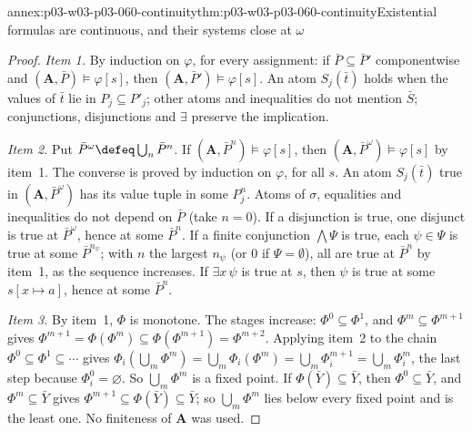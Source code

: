 \begin{annexitem}{annex:p03-w03-p03-060-continuity}{thm:p03-w03-p03-060-continuity}{Existential formulas are continuous, and their systems close at \(\omega\)}
\begin{proof}
\emph{Item 1.} By induction on \(\varphi\), for every assignment: if
\(\bar P\subseteq\bar P'\) componentwise and
\((\mathbf A,\bar P)\models\varphi[s]\), then
\((\mathbf A,\bar P')\models\varphi[s]\). An atom \(S_j(\bar t)\) holds
when the values of \(\bar t\) lie in \(P_j\subseteq P'_j\); other atoms and
inequalities do not mention \(\bar S\); conjunctions, disjunctions and
\(\exists\) preserve the implication.

\emph{Item 2.} Put \(\bar P^\omega\defeq\bigcup_n\bar P^n\). If
\((\mathbf A,\bar P^n)\models\varphi[s]\), then
\((\mathbf A,\bar P^\omega)\models\varphi[s]\) by item~1. The converse is
proved by induction on \(\varphi\), for all \(s\). An atom
\(S_j(\bar t)\) true in \((\mathbf A,\bar P^\omega)\) has its value tuple
in some \(P^n_j\). Atoms of \(\sigma\), equalities and inequalities do not
depend on \(\bar P\) (take \(n=0\)). If a disjunction is true, one
disjunct is true at \(\bar P^\omega\), hence at some \(\bar P^n\). If a
finite conjunction \(\bigwedge\Psi\) is true, each \(\psi\in\Psi\) is true
at some \(\bar P^{n_\psi}\); with \(n\) the largest \(n_\psi\) (or \(0\) if
\(\Psi=\emptyset\)), all are true at \(\bar P^n\) by item~1, as the
sequence increases. If \(\exists x\,\psi\) is true at \(s\), then \(\psi\)
is true at some \(s[x\mapsto a]\), hence at some \(\bar P^n\).

\emph{Item 3.} By item~1, \(\Phi\) is monotone. The stages increase:
\(\Phi^0\subseteq\Phi^1\), and \(\Phi^m\subseteq\Phi^{m+1}\) gives
\(\Phi^{m+1}=\Phi(\Phi^m)\subseteq\Phi(\Phi^{m+1})=\Phi^{m+2}\). Applying
item~2 to the chain \(\Phi^0\subseteq\Phi^1\subseteq\cdots\) gives
\(\Phi_i(\bigcup_m\Phi^m)=\bigcup_m\Phi_i(\Phi^m)=\bigcup_m\Phi^{m+1}_i=\bigcup_m\Phi^m_i\),
the last step because \(\Phi^0_i=\varnothing\). So \(\bigcup_m\Phi^m\) is a
fixed point. If \(\Phi(\bar Y)\subseteq\bar Y\), then
\(\Phi^0\subseteq\bar Y\), and \(\Phi^m\subseteq\bar Y\) gives
\(\Phi^{m+1}\subseteq\Phi(\bar Y)\subseteq\bar Y\); so
\(\bigcup_m\Phi^m\) lies below every fixed point and is the least one. No
finiteness of \(\mathbf A\) was used.
\end{proof}
\end{annexitem}

